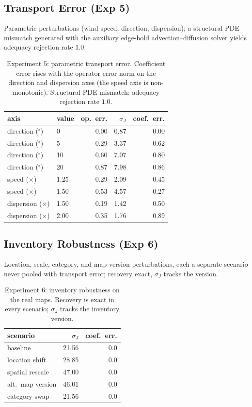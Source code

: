 \subsection{Transport Error (Exp 5)}
\label{subsec:results_h5a}
Parametric perturbations (wind speed, direction, dispersion); a structural PDE
mismatch generated with the auxiliary edge-hold advection--diffusion solver yields
adequacy rejection rate $1.0$.
\begin{table}[t]
\centering
\footnotesize
\caption{Experiment 5: parametric transport error. Coefficient error rises with
the operator error norm on the direction and dispersion axes (the speed axis is
non-monotonic). Structural PDE mismatch: adequacy rejection rate $1.0$.}
\label{tab:results_h5a}
\begin{tabular}{llrrr}
\toprule
axis & value & op.\ err. & $\sigma_J$ & coef.\ err. \\
\midrule
direction ($^\circ$) & 0  & 0.00 & 0.87 & 0.00 \\
direction ($^\circ$) & 5  & 0.29 & 3.37 & 0.62 \\
direction ($^\circ$) & 10 & 0.60 & 7.07 & 0.80 \\
direction ($^\circ$) & 20 & 0.87 & 7.98 & 0.86 \\
speed ($\times$)     & 1.25 & 0.29 & 2.09 & 0.45 \\
speed ($\times$)     & 1.50 & 0.53 & 4.57 & 0.27 \\
dispersion ($\times$)& 1.50 & 0.19 & 1.42 & 0.50 \\
dispersion ($\times$)& 2.00 & 0.35 & 1.76 & 0.89 \\
\bottomrule
\end{tabular}
\end{table}

\subsection{Inventory Robustness (Exp 6)}
\label{subsec:results_h5b}
Location, scale, category, and map-version perturbations, each a separate scenario
never pooled with transport error; recovery exact, $\sigma_J$ tracks the version.
\begin{table}[t]
\centering
\footnotesize
\caption{Experiment 6: inventory robustness on the real maps. Recovery is exact in
every scenario; $\sigma_J$ tracks the inventory version.}
\label{tab:results_h5b}
\begin{tabular}{lrr}
\toprule
scenario & $\sigma_J$ & coef.\ err. \\
\midrule
baseline        & 21.56 & 0.0 \\
location shift   & 28.85 & 0.0 \\
spatial rescale  & 47.00 & 0.0 \\
alt.\ map version & 46.01 & 0.0 \\
category swap     & 21.56 & 0.0 \\
\bottomrule
\end{tabular}
\end{table}


